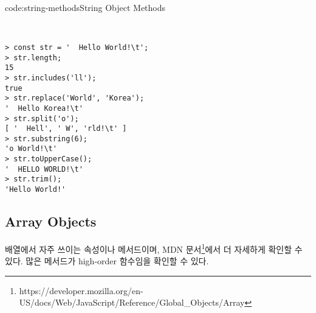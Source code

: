 \begin{codeenv}{code:string-methods}{String Object Methods}\begin{verbatim}


> const str = '  Hello World!\t';
> str.length;
15
> str.includes('ll');
true
> str.replace('World', 'Korea');
'  Hello Korea!\t'
> str.split('o');
[ '  Hell', ' W', 'rld!\t' ]
> str.substring(6);
'o World!\t'
> str.toUpperCase();
'  HELLO WORLD!\t'
> str.trim();
'Hello World!'
\end{verbatim}
\end{codeenv}

\subsection*{Array Objects}

배열에서 자주 쓰이는 속성이나 메서드이며, MDN 문서\footnote{https://developer.mozilla.org/en-US/docs/Web/JavaScript/Reference/Global\_Objects/Array}에서 더 자세하게 확인할 수 있다. 많은 메서드가 high-order 함수임을 확인할 수 있다.

